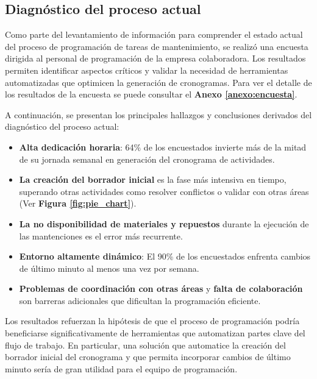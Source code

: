 \documentclass{article}
\begin{document}
\subsection{Diagnóstico del proceso actual}

Como parte del levantamiento de información para comprender el estado actual del proceso de programación de tareas de mantenimiento, se realizó una encuesta dirigida al personal de programación de la empresa colaboradora. Los resultados permiten identificar aspectos críticos y validar la necesidad de herramientas automatizadas que optimicen la generación de cronogramas. Para ver el detalle de los resultados de la encuesta se puede consultar el \textbf{Anexo \ref{anexo:encuesta}}.

A continuación, se presentan los principales hallazgos y conclusiones derivados del diagnóstico del proceso actual:

\begin{itemize}
    \item \textbf{Alta dedicación horaria}: 64\% de los encuestados invierte más de la mitad de su jornada semanal en generación del cronograma de actividades.
    \item \textbf{La creación del borrador inicial} es la fase más intensiva en tiempo, superando otras actividades como resolver conflictos o validar con otras áreas (Ver \textbf{Figura \ref{fig:pie_chart}}).
    \item \textbf{La no disponibilidad de materiales y repuestos} durante la ejecución de las mantenciones es el error más recurrente.
    \item \textbf{Entorno altamente dinámico}: El 90\% de los encuestados enfrenta cambios de último minuto al menos una vez por semana.
    \item \textbf{Problemas de coordinación con otras áreas} y \textbf{falta de colaboración} son barreras adicionales que dificultan la programación eficiente.
\end{itemize}

Los resultados refuerzan la hipótesis de que el proceso de programación podría beneficiarse significativamente de herramientas que automatizan partes clave del flujo de trabajo. En particular, una solución que automatice la creación del borrador inicial del cronograma y que permita incorporar cambios de último minuto sería de gran utilidad para el equipo de programación.
\end{document}
